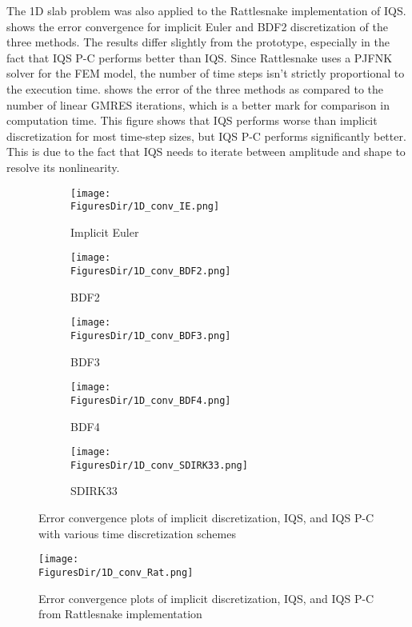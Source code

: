 The 1D slab problem was also applied to the Rattlesnake implementation of IQS.   shows the error convergence for implicit Euler and BDF2 discretization of the three methods.  The results differ slightly from the prototype, especially in the fact that IQS P-C performs better than IQS.  Since Rattlesnake uses a PJFNK solver for the FEM model, the number of time steps isn't strictly proportional to the execution time.   shows the error of the three methods as compared to the number of linear GMRES iterations, which is a better mark for comparison in computation time.  This figure shows that IQS performs worse than implicit discretization for most time-step sizes, but IQS P-C performs significantly better.  This is due to the fact that IQS needs to iterate between amplitude and shape to resolve its nonlinearity.

\begin{figure}[!htbp]
\centering
\begin{subfigure}[b]{0.49\textwidth}
\centering
\texttt{[image: \\FiguresDir/1D\_conv\_IE.png]}
\caption{Implicit Euler}
\end{subfigure}
\begin{subfigure}[b]{0.49\textwidth}
\centering
\texttt{[image: \\FiguresDir/1D\_conv\_BDF2.png]}
\caption{BDF2}
\end{subfigure}
\begin{subfigure}[b]{0.49\textwidth}
\centering
\texttt{[image: \\FiguresDir/1D\_conv\_BDF3.png]}
\caption{BDF3}
\end{subfigure}
\begin{subfigure}[b]{0.49\textwidth}
\centering
\texttt{[image: \\FiguresDir/1D\_conv\_BDF4.png]}
\caption{BDF4}
\end{subfigure}
\begin{subfigure}[b]{0.49\textwidth}
\centering
\texttt{[image: \\FiguresDir/1D\_conv\_SDIRK33.png]}
\caption{SDIRK33}
\end{subfigure}
\caption{Error convergence plots of implicit discretization, IQS, and IQS P-C with various time discretization schemes}
\label{fig:1D_conv}
\end{figure}

\begin{figure}[!htbp]
\begin{center}
\texttt{[image: \\FiguresDir/1D\_conv\_Rat.png]}
\caption{Error convergence plots of implicit discretization, IQS, and IQS P-C from Rattlesnake implementation}
\label{fig:1D_conv_Rat}
\end{center}
\end{figure}

